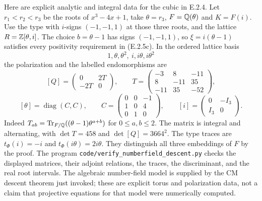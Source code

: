 Here are explicit analytic and integral data for the cubic in E.2.4. Let $r_1<r_2<r_3$ be the roots of $x^3-4x+1$, take $\theta=r_3$, $F=\mathbb Q(\theta)$ and $K=F(i)$. Use the type with $i$-signs $(-1,-1,1)$ at those three roots, and the lattice $R=\mathbb Z[\theta,i]$. The choice $b=\theta-1$ has signs $(-1,-1,1)$, so $\xi=i(\theta-1)$ satisfies every positivity requirement in (E.2.5c). In the ordered lattice basis
\[
 1,\theta,\theta^2,\ i,i\theta,i\theta^2
\]
the polarization and the labelled endomorphisms are
\[
 [Q]=\begin{pmatrix}0&2T\\-2T&0\end{pmatrix},\qquad
 T=\begin{pmatrix}-3&8&-11\\8&-11&35\\-11&35&-52\end{pmatrix},
 \tag{E.2.5e}
\]
\[
 [\theta]=\operatorname{diag}(C,C),\qquad
 C=\begin{pmatrix}0&0&-1\\1&0&4\\0&1&0\end{pmatrix},
 \qquad
 [i]=\begin{pmatrix}0&-I_3\\I_3&0\end{pmatrix}.
\]
Indeed $T_{ab}=\operatorname{Tr}_{F/\mathbb Q}((\theta-1)\theta^{a+b})$ for $0\le a,b\le2$. The matrix is integral and alternating, with $\det T=458$ and $\det[Q]=3664^2$. The type traces are $t_\Phi(i)=-i$ and $t_\Phi(i\theta)=2i\theta$. They distinguish all three embeddings of $F$ by the proof. The program \texttt{code/verify\_numberfield\_descent.py} checks the displayed matrices, their adjoint relations, the traces, the discriminant, and the real root intervals. The algebraic number-field model is supplied by the CM descent theorem just invoked; these are explicit torus and polarization data, not a claim that projective equations for that model were numerically computed.

